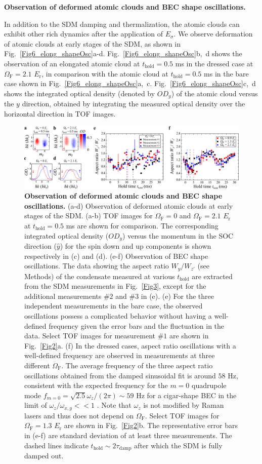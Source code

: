 \documentclass[showpacs,preprintnumbers,amsmath,amssymb, superscriptaddress, aps, reprint]{revtex4-1}
\def\E_r{E_{\text{r}}}
\def\OmegaF{\Omega_{\text{F}}}
\def\thold{t_{\text{hold}}}
\begin{document}
{\textbf{Observation of deformed atomic clouds and BEC shape oscillations.}

{In addition to the SDM damping and thermalization, the atomic clouds can exhibit other rich dynamics after the application of $E_{\sigma}$. 
We observe deformation of atomic clouds at early stages of the SDM, as shown in Fig.~{\ref{Fig6_elong_shapeOsc}}a-d. Fig.~{\ref{Fig6_elong_shapeOsc}}b,~d shows the observation of an elongated atomic cloud at $\thold = 0.5$ ms in the dressed case at $\OmegaF = 2.1$ $\E_r$, in comparison with the atomic cloud at $\thold = 0.5$ ms in the bare case shown in Fig.~{\ref{Fig6_elong_shapeOsc}}a,~c. Fig.~{\ref{Fig6_elong_shapeOsc}}c,~d shows the integrated optical density (denoted by $OD_y$) of the atomic cloud versus the $y$ direction, obtained by integrating the measured optical density over the horizontal direction in TOF images. 
\begin{figure}[ht]
\centering
\includegraphics[width=7.0in]{Fig5_elong_shapeOsc_final.pdf}
\caption{{\textbf{Observation of deformed atomic clouds and BEC shape oscillations.}} (a-d) Observation of deformed atomic clouds at early stages of the SDM. (a-b) TOF images for $\OmegaF = 0$ and $\OmegaF = 2.1$ $\E_r$ at $\thold = 0.5$ ms are shown for comparison. The corresponding integrated optical density ($OD_y$) versus the momentum in the SOC direction ($\hat{y}$) for the spin down and up components is shown respectively in (c) and (d). (e-f) Observation of BEC shape oscillations. The data showing the aspect ratio $W_y/W_{z'}$ (see Methods) of the condensate measured at various $\thold$ are extracted from the SDM measurements in Fig.~\ref{Fig3}, except for the additional measurements \#$2$ and \#$3$ in (e). (e) For the three independent measurements in the bare case, the observed oscillations possess a complicated behavior without having a well-defined frequency given the error bars and the fluctuation in the data. Select TOF images for measurement \#$1$ are shown in Fig.~\ref{Fig2}a. (f) In the dressed cases, aspect ratio oscillations with a well-defined frequency are observed in measurements at three different $\OmegaF$. The average frequency of the three aspect ratio oscillations obtained from the damped sinusoidal fit is around $58$ Hz, consistent with the expected frequency for the ${m=0}$ quadrupole mode ${f_{m = 0}} = \sqrt {2.5} {\omega _z}/(2\pi )\sim 59$ Hz for a cigar-shape BEC in the limit of ${\omega _z}/{\omega _{x,y}} << 1$ \cite{Stringari_Collective_PRL1996}. Note that $\omega_z$ is not modified by Raman lasers and thus does not depend on $\OmegaF$. Select TOF images for $\OmegaF = 1.3$ $\E_r$ are shown in Fig.~\ref{Fig2}b. The representative error bars in (e-f) are standard deviation of at least three measurements. The dashed lines indicate ${\thold}\sim 2{\tau_{\text{damp}}}$ after which the SDM is fully damped out.}

\end{figure}}}
\end{document}
